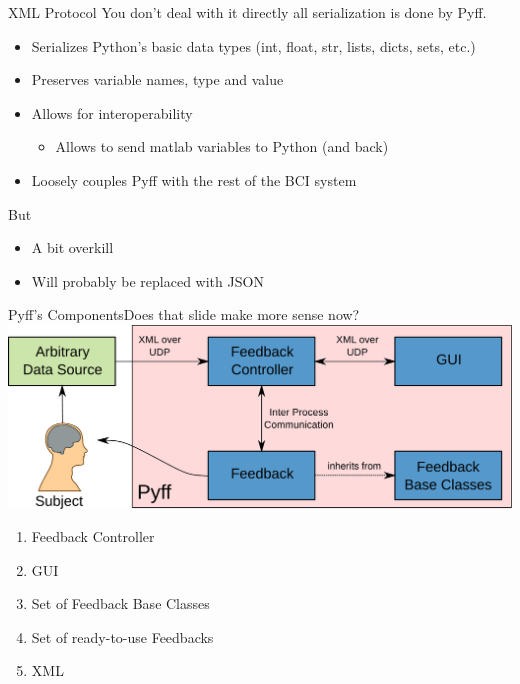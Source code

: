 \documentclass{beamer}
\begin{document}
\begin{frame}{XML Protocol}
    You don't deal with it directly all serialization is done by Pyff.
    \begin{itemize}
        \item Serializes Python's basic data types (int, float, str, lists,
            dicts, sets, etc.)
        \item Preserves variable names, type and value
        \item Allows for \alert{interoperability}
            \begin{itemize}
                \item Allows to send matlab variables to Python (and back)
            \end{itemize}
        \item \alert{Loosely} couples Pyff with the rest of the BCI system
    \end{itemize}

    \begin{block}{But}
        \begin{itemize}
            \item A bit overkill
            \item Will probably be replaced with JSON
        \end{itemize}
    \end{block}
\end{frame}

\begin{frame}{Pyff's Components}{Does that slide make more sense now?}
    \includegraphics[width=\linewidth]{pyff_overview}
    \vfill
    \begin{enumerate}
        \item Feedback Controller
        \item GUI
        \item Set of Feedback Base Classes
        \item Set of ready-to-use Feedbacks
        \item XML
    \end{enumerate}
\end{frame}
\end{document}
